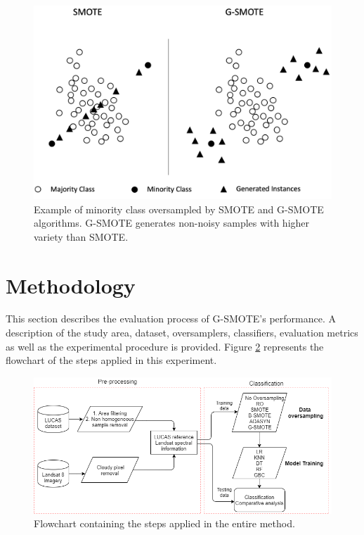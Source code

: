 \documentclass[remotesensing,article,submit,moreauthors,pdftex]{Definitions/mdpi}
\begin{document}
\begin{figure}[H]
	\centering
	\includegraphics[width=1\linewidth]{../analysis/gsmote_smote}
	\caption{Example of minority class oversampled by SMOTE and G-SMOTE
		algorithms. G-SMOTE generates non-noisy samples
		with higher variety than SMOTE.}
	\label{fig:gsmote_smote}
\end{figure}

\section{Methodology}

This section describes the evaluation process of G-SMOTE's performance. A
description of the study area, dataset, oversamplers, classifiers, evaluation
metrics as well as the experimental procedure is provided. Figure
\ref{fig:flowchart} represents the flowchart of the steps applied in this
experiment.

\begin{figure}[H]
	\centering
	\includegraphics[width=1\linewidth]{../analysis/g_smote_flow_chart}
	\caption{Flowchart containing the steps applied in the entire method.}
	\label{fig:flowchart}
\end{figure}
\end{document}
